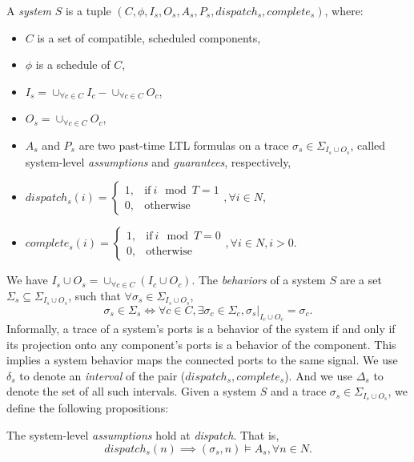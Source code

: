 A \emph{system} $S$ is a tuple $(C, \phi, I_s, O_s, A_s, P_s, dispatch_s, complete_s)$, where:
\begin{itemize}
	\item $C$ is a set of compatible, scheduled components,
	\item $\phi$ is a schedule of $C$,	
	\item $I_s = \cup_{\forall c \in C}I_c -  \cup_{\forall c \in C}O_c$,
	\item $O_s = \cup_{\forall c \in C}O_c$,
	\item $A_s$ and $P_s$ are two past-time LTL formulas on a trace $\sigma_s \in \Sigma_{I_s \cup O_s}$, called system-level \emph{assumptions} and \emph{guarantees}, respectively,
	\item $dispatch_s (i) = 
	    	\begin{cases}
      		1, & \text{if}\ i \mod T =1 \\
	     	0, & \text{otherwise}
   	 	\end{cases}, \forall i \in N$,
   	\item $complete_s (i) =
   		\begin{cases}
      		1, & \text{if}\ i \mod T = 0 \\
	     	0, & \text{otherwise}
   	 	\end{cases}, \forall i \in N, i > 0$.
\end{itemize}
We have $I_s  \cup O_s = \cup_{\forall c \in C}(I_c \cup O_c)$.
The \emph{behaviors} of a system $S$ are a set $\Sigma_s \subseteq \Sigma_{I_s \cup O_s}$, such that $\forall \sigma_s \in \Sigma_{I_s \cup O_s}$, 
\begin{equation*}
	\sigma_s\in \Sigma_s  \iff \forall c \in C, \exists \sigma_c \in \Sigma_c, \sigma_s|_{I_c \cup O_c} = \sigma_c.
\end{equation*}
Informally, a trace of a system's ports is a behavior of the system if and only if its projection onto any component's ports is a behavior of the component. 
This implies a system behavior maps the connected ports to the same signal.
We use $\delta_s$ to denote an \emph{interval} of the pair ($dispatch_s, complete_s$). And we use $\Delta_s$ to denote the set of all such intervals.
Given a system $S$ and a trace $\sigma_s \in \Sigma_{I_s \cup O_s}$, we define the following propositions:

\bigskip
The system-level \emph{assumptions} hold at \emph{dispatch}. That is,
\begin{equation} 
\label{eqn:sys_assumption}
	dispatch_s(n) \implies (\sigma_s, n) \models A_s, \forall n\in N.
\end{equation}

